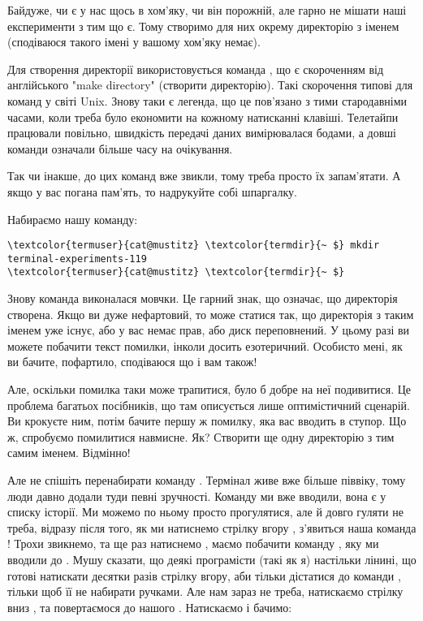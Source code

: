 \medskip

Байдуже, чи є у нас щось в хом'яку, чи він порожній,
але гарно не мішати наші експерименти з тим що є.
Тому створимо для них окрему директорію з іменем 
(сподіваюся такого імені у вашому хом'яку немає).

Для створення директорії використовується команда ,
що є скороченням від англійського "make directory" (створити директорію).
Такі скорочення типові для команд у світі Unix.
Знову таки є легенда, що це пов'язано з тими стародавніми часами,
коли треба було економити на кожному натисканні клавіші.
Телетайпи працювали повільно, швидкість передачі даних вимірювалася бодами,
а довші команди означали більше часу на очікування.

Так чи інакше, до цих команд вже звикли, тому треба просто їх запам'ятати.
А якщо у вас погана пам'ять, то надрукуйте собі шпаргалку.

Набираємо нашу команду:

\begin{Verbatim}[fontsize=\footnotesize,commandchars=\\\{\},xleftmargin=\parindent]
\textcolor{termuser}{cat@mustitz} \textcolor{termdir}{~ $} mkdir terminal-experiments-119
\textcolor{termuser}{cat@mustitz} \textcolor{termdir}{~ $}
\end{Verbatim}

Знову команда виконалася мовчки.
Це гарний знак, що означає, що директорія створена.
Якщо ви дуже нефартовий, то може статися так,
що директорія з таким іменем уже існує,
або у вас немає прав, або диск переповнений.
У цьому разі ви можете побачити текст помилки, інколи досить езотеричний.
Особисто мені, як ви бачите, пофартило, сподіваюся що і вам також!

Але, оскільки помилка таки може трапитися, було б добре на неї подивитися.
Це проблема багатьох посібників, що там описується лише оптимістичний сценарій.
Ви крокуєте ним, потім бачите першу ж помилку, яка вас вводить в ступор.
Що ж, спробуємо помилитися навмисне.
Як?
Створити ще одну директорію з тим самим іменем.
Відмінно!

Але не спішіть перенабирати команду .
Термінал живе вже більше піввіку, тому люди давно додали туди певні зручності.
Команду ми вже вводили, вона є у списку історії.
Ми можемо по ньому просто прогулятися, але й довго гуляти не треба,
відразу після того, як ми натиснемо стрілку вгору \keys{\arrowkeyup},
з'явиться наша команда !
Трохи звикнемо, та ще раз натиснемо \keys{\arrowkeyup}, маємо побачити команду ,
яку ми вводили до .
Мушу сказати, що деякі програмісти (такі як я) настільки лінині,
що готові натискати десятки разів стрілку вгору,
аби тільки дістатися до команди , тільки щоб її не набирати ручками.
Але нам зараз  не треба, натискаємо стрілку вниз \keys{\arrowkeydown},
та повертаємося до нашого .
Натискаємо \keys{\return} і бачимо:

